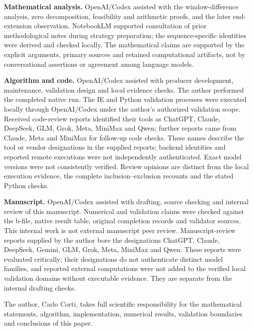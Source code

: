 \documentclass[11pt]{article}
\theoremstyle{definition}
\theoremstyle{remark}
\begin{document}
\noindent\textbf{Mathematical analysis.}
OpenAI/Codex assisted with the window-difference analysis, zero decomposition,
feasibility and arithmetic proofs, and the later end-extension observation.
NotebookLM supported consultation of prior methodological notes during
strategy preparation; the sequence-specific identities were derived and
checked locally.
The mathematical claims are supported by the explicit arguments, primary
sources and retained computational artifacts, not by conversational assertions
or agreement among language models.

\smallskip
\noindent\textbf{Algorithm and code.}
OpenAI/Codex assisted with producer development, maintenance, validation design
and local evidence checks. The author performed the completed native run.
The IE and Python validation processes were executed locally through
OpenAI/Codex under the author's authorized validation scope.
Received code-review reports identified their tools as ChatGPT, Claude,
DeepSeek, GLM, Grok, Meta, MiniMax and Qwen; further reports came from Claude,
Meta and MiniMax for follow-up code checks. These names describe the tool
or vendor designations in the supplied
reports; backend identities and reported remote executions were not
independently authenticated. Exact model versions were not consistently
verified. Review opinions are distinct from the local execution evidence,
the complete inclusion--exclusion recounts and the stated Python checks.

\smallskip
\noindent\textbf{Manuscript.}
OpenAI/Codex assisted with drafting, source checking and internal review of
this manuscript. Numerical and validation claims were checked against the
b-file, native result table, original completion records and validator
sources. This internal work is not external manuscript peer review.
Manuscript-review reports supplied by the author bore the designations
ChatGPT, Claude, DeepSeek, Gemini, GLM, Grok, Meta, MiniMax and Qwen.
These reports were evaluated critically; their designations do not
authenticate distinct model families, and reported external computations
were not added to the verified local validation domains without executable
evidence. They are separate from the internal drafting checks.

\smallskip
The author, Carlo Corti, takes full scientific responsibility for the
mathematical statements, algorithm, implementation, numerical results,
validation boundaries and conclusions of this paper.
\end{document}
